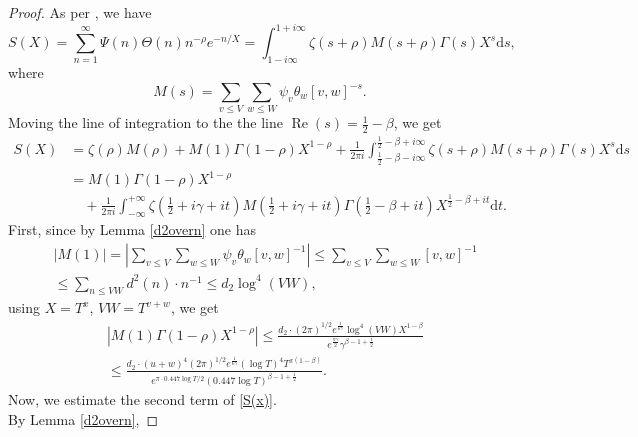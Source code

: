 \documentclass[reqno]{amsart}
\numberwithin{equation}{section}
\theoremstyle{remark}
\begin{document}
\begin{proof}
    As per \cite{pintz_new_2019}, we have
    \begin{equation*}
        S(X)=\sum_{n=1}^{\infty}\Psi(n)\Theta(n) n^{-\rho}e^{-n / X}=\int_{1-i \infty}^{1+i \infty} \zeta(s+\rho) M(s+\rho) \Gamma(s) X^s \text{d} s,
    \end{equation*}
    where 
    \[
M(s)=\sum_{v \leq V} \sum_{w \leq W} \psi_v \theta_w [v, w]^{-s}.
\]
    Moving the line of integration to the the line $\operatorname{Re}(s)=\frac{1}{2}-\beta$, we get
    \begin{equation}\label{S(x)}
    \begin{aligned}
        S(X)&=\zeta(\rho)M(\rho)+M(1)\Gamma(1-\rho)X^{1-\rho}+\frac{1}{2\pi i}\int_{\frac{1}{2}-\beta-i \infty}^{\frac{1}{2}-\beta+i \infty} \zeta(s+\rho) M(s+\rho) \Gamma(s) X^s \text{d} s\\&=M(1)\Gamma(1-\rho)X^{1-\rho}\\&\quad +\frac{1}{2\pi i}\int_{- \infty}^{+ \infty} \zeta\left(\frac{1}{2}+i\gamma+it\right) M\left(\frac{1}{2}+i\gamma+it\right) \Gamma\left(\frac{1}{2}-\beta+it\right) X^{\frac{1}{2}-\beta+it} \text{d} t.
    \end{aligned}
    \end{equation}
First, since by Lemma \ref{d2overn} one has
\begin{equation*}
    \begin{aligned}
        &\left|M\left(1\right)\right|=\left|\sum_{v \leq V} \sum_{w \leq W} \psi_v \theta_w [v, w]^{-1}\right|\le \sum_{v \leq V} \sum_{w \leq W} [v, w]^{-1}\\&\le \sum_{n\le VW}d^{2}(n)\cdot n^{-1} \le   d_2\log^4(VW),
    \end{aligned}
\end{equation*}
using $X=T^x$, $VW=T^{v+w}$, we get
\begin{equation}\label{firstfromresidue}
    \begin{aligned}
       &| M(1)\Gamma(1-\rho)X^{1-\rho}|\le \frac{ d_2\cdot (2\pi)^{1/2}e^{\frac{1}{6\gamma}}\log^4(VW)X^{1-\beta}}{e^{\frac{\pi \gamma}{2}}\gamma^{\beta-1+\frac{1}{2}}}\\& \le \frac{ d_2\cdot (u+w)^4(2\pi)^{1/2}e^{\frac{1}{6\gamma}}(\log T)^4T^{x(1-\beta)}}{e^{\pi\cdot 0.447 \log T/2}(0.447\log T)^{\beta-1+\frac{1}{2}}}.
    \end{aligned}
\end{equation}
Now, we estimate the second term of \eqref{S(x)}.\\
By Lemma \ref{d2overn},

\end{proof}
\end{document}
